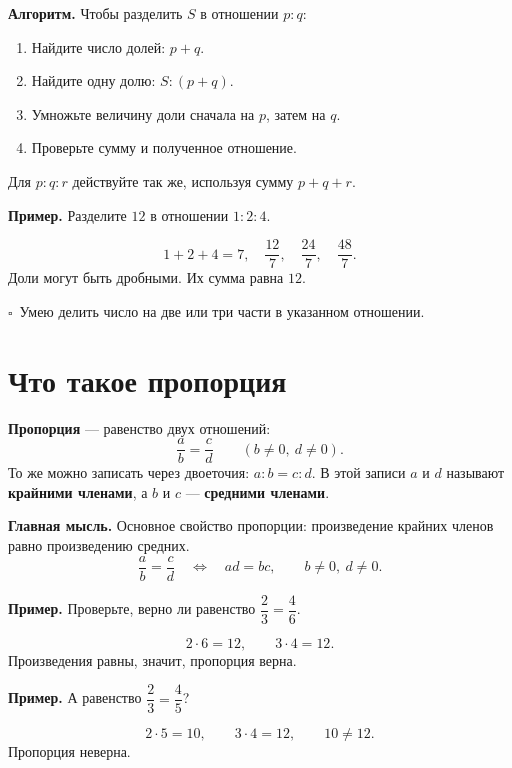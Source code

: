 \documentclass[a4paper,12pt]{article}
\newcommand{\keyidea}[1]{\textcolor{darkaccent}{\textbf{Главная мысль.}} #1}
\newcommand{\example}[1]{\par\medskip\textcolor{darkaccent}{\textbf{Пример.}} #1\par}
\newcommand{\checkmarkline}[1]{\par\smallskip\textcolor{darkaccent}{$\square$}\ #1\par}
\begin{document}
\textcolor{darkaccent}{\textbf{Алгоритм.}} Чтобы разделить $S$ в отношении $p:q$:
\begin{enumerate}
\item Найдите число долей: $p+q$.
\item Найдите одну долю: $S:(p+q)$.
\item Умножьте величину доли сначала на $p$, затем на $q$.
\item Проверьте сумму и полученное отношение.
\end{enumerate}
Для $p:q:r$ действуйте так же, используя сумму $p+q+r$.

\example{Разделите $12$ в отношении $1:2:4$.}
\[
1+2+4=7,\quad \boxed{\frac{12}{7}},\quad
\boxed{\frac{24}{7}},\quad\boxed{\frac{48}{7}}.
\]
Доли могут быть дробными. Их сумма равна $12$.

\checkmarkline{Умею делить число на две или три части в указанном отношении.}

\section{Что такое пропорция}
\textbf{Пропорция} --- равенство двух отношений:
\[
\frac ab=\frac cd \qquad (b\ne0,\ d\ne0).
\]
То же можно записать через двоеточия: $a:b=c:d$.
В этой записи $a$ и $d$ называют \textbf{крайними членами},
а $b$ и $c$ --- \textbf{средними членами}.

\begin{center}
\end{center}
\keyidea{Основное свойство пропорции: произведение крайних членов
равно произведению средних.}
\[
\boxed{\frac ab=\frac cd\quad\Longleftrightarrow\quad ad=bc},
\qquad b\ne0,\ d\ne0.
\]

\example{Проверьте, верно ли равенство $\dfrac23=\dfrac46$.}
\[
2\cdot6=12,\qquad3\cdot4=12.
\]
Произведения равны, значит, пропорция верна.

\example{А равенство $\dfrac23=\dfrac45$?}
\[
2\cdot5=10,\qquad3\cdot4=12,\qquad10\ne12.
\]
Пропорция неверна.
\end{document}
